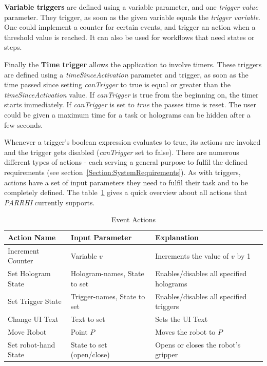 \textbf{Variable triggers} are defined using a variable parameter, and one \textit{trigger value} parameter. They trigger, as soon as the given variable equals the \textit{trigger variable}. One could implement a counter for certain events, and trigger an action when a threshold value is reached. It can also be used for workflows that need states or steps. 

Finally the \textbf{Time trigger} allows the application to involve timers. These triggers are defined using a \textit{timeSinceActivation} parameter and trigger, as soon as the time passed since setting \textit{canTrigger} to true is equal or greater than the \textit{timeSinceActivation} value. If \textit{canTrigger} is true from the beginning on, the timer starts immediately. If \textit{canTrigger} is set to \textit{true} the passes time is reset. The user could be given a maximum time for a task or holograms can be hidden after a few seconds.

Whenever a trigger's boolean expression evaluates to true, its actions are invoked and the trigger gets disabled (\textit{canTrigger} set to false). There are numerous different types of actions - each serving a general purpose to fulfil the defined requirements (see section~\ref{Section:SystemRequirements}). As with triggers, actions have a set of input parameters they need to fulfil their task and to be completely defined. The table~\ref{Table:Actions} gives a quick overview about all actions that \textit{PARRHI} currently supports.

\begin{table}
	\caption{Event Actions}
	\label{Table:Actions}
	\centering
	\begin{tabular}{lll}
		\toprule
		Action Name & Input Parameter		& Explanation	\\		
		\midrule
		Increment Counter  	& Variable $v$					& Increments the value of $v$ by 1 \\
		Set Hologram State 	& Hologram-names, State to set	& Enables/disables all specified holograms \\
		Set Trigger State  	& Trigger-names, State to set  	& Enables/disables all specified triggers \\
		Change UI Text	  	& Text to set					& Sets the UI Text\\
		Move Robot			& Point $P$						& Moves the robot to $P$ \\
		Set robot-hand State & State to set (open/close)		& Opens or closes the robot's gripper \\
		\bottomrule
	\end{tabular}
\end{table}

